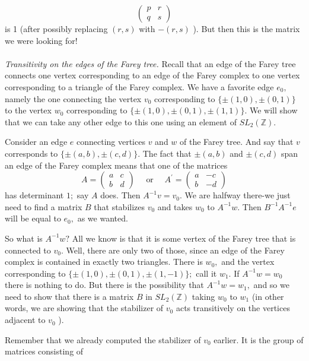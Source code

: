 \[
\left(\begin{array}{ll}
p & r \\
q & s
\end{array}\right)
\]
is 1 (after possibly replacing $(r, s)$ with $-(r, s)$ ). But then this is the matrix we were looking for!
\\
\\
\noindent
\textit{Transitivity on the edges of the Farey tree.} Recall that an edge of the Farey tree connects one vertex corresponding to an edge of the Farey complex to one vertex corresponding to a triangle of the Farey complex. We have a favorite edge $e_{0},$ namely the one connecting the vertex $v_{0}$ corresponding to $\{\pm(1,0), \pm(0,1)\}$ to the vertex $w_{0}$ corresponding to $\{\pm(1,0), \pm(0,1), \pm(1,1)\} .$ We will show that we can take any other edge to this one using an element of $SL_2(\mathbb{Z})$.
\par
Consider an edge $e$ connecting vertices $v$ and $w$ of the Farey tree. And say that $v$ corresponds to $\{\pm(a, b), \pm(c, d)\} .$ The fact that $\pm(a, b)$ and $\pm(c, d)$ span an edge of the Farey complex means that one of the matrices
\[
A=\left(\begin{array}{ll}
a & c \\
b & d
\end{array}\right) \quad \text { or } \quad A^{\prime}=\left(\begin{array}{cc}
a & -c \\
b & -d
\end{array}\right)
\]
has determinant $1 ;$ say $A$ does. Then $A^{-1} v=v_{0} .$ We are halfway there-we just need to find a matrix $B$ that stabilizes $v_{0}$ and takes $w_{0}$ to $A^{-1} w .$ Then $B^{-1} A^{-1} e$ will be equal to $e_{0},$ as we wanted.
\par
So what is $A^{-1} w ?$ All we know is that it is some vertex of the Farey tree that is connected to $v_{0} .$ Well, there are only two of those, since an edge of the Farey complex is contained in exactly two triangles. There is $w_{0},$ and the vertex corresponding to $\{\pm(1,0), \pm(0,1), \pm(1,-1)\} ;$ call it $w_{1} .$ If $A^{-1} w=w_{0}$ there is nothing to do. But there is the possibility that $A^{-1} w=w_{1},$ and so we need to show that there is a matrix $B$ in $SL_2(\mathbb{Z})$ taking $w_{0}$ to $w_{1}$ (in other words, we are showing that the stabilizer of $v_{0}$ acts transitively on the vertices adjacent to $v_{0}$ ).
\par
Remember that we already computed the stabilizer of $v_{0}$ earlier. It is the group of matrices consisting of
